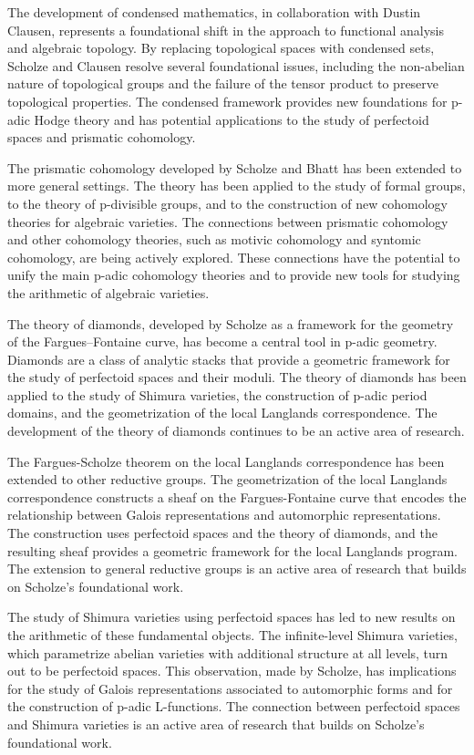 The development of condensed mathematics, in collaboration with Dustin Clausen, represents a foundational shift in the approach to functional analysis and algebraic topology. By replacing topological spaces with condensed sets, Scholze and Clausen resolve several foundational issues, including the non-abelian nature of topological groups and the failure of the tensor product to preserve topological properties. The condensed framework provides new foundations for p-adic Hodge theory and has potential applications to the study of perfectoid spaces and prismatic cohomology.

The prismatic cohomology developed by Scholze and Bhatt has been extended to more general settings. The theory has been applied to the study of formal groups, to the theory of p-divisible groups, and to the construction of new cohomology theories for algebraic varieties. The connections between prismatic cohomology and other cohomology theories, such as motivic cohomology and syntomic cohomology, are being actively explored. These connections have the potential to unify the main p-adic cohomology theories and to provide new tools for studying the arithmetic of algebraic varieties.

The theory of diamonds, developed by Scholze as a framework for the geometry of the Fargues--Fontaine curve, has become a central tool in p-adic geometry. Diamonds are a class of analytic stacks that provide a geometric framework for the study of perfectoid spaces and their moduli. The theory of diamonds has been applied to the study of Shimura varieties, the construction of p-adic period domains, and the geometrization of the local Langlands correspondence. The development of the theory of diamonds continues to be an active area of research.

The Fargues-Scholze theorem on the local Langlands correspondence has been extended to other reductive groups. The geometrization of the local Langlands correspondence constructs a sheaf on the Fargues-Fontaine curve that encodes the relationship between Galois representations and automorphic representations. The construction uses perfectoid spaces and the theory of diamonds, and the resulting sheaf provides a geometric framework for the local Langlands program. The extension to general reductive groups is an active area of research that builds on Scholze's foundational work.

The study of Shimura varieties using perfectoid spaces has led to new results on the arithmetic of these fundamental objects. The infinite-level Shimura varieties, which parametrize abelian varieties with additional structure at all levels, turn out to be perfectoid spaces. This observation, made by Scholze, has implications for the study of Galois representations associated to automorphic forms and for the construction of p-adic L-functions. The connection between perfectoid spaces and Shimura varieties is an active area of research that builds on Scholze's foundational work.

